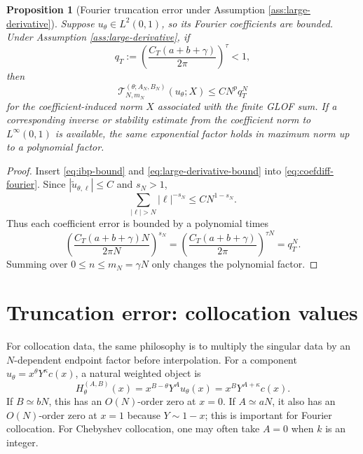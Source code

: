 \documentclass[11pt]{article}
\newtheorem{proposition}{Proposition}
\newcommand{\cT}{\mathcal{T}}
\begin{document}
\begin{proposition}[Fourier truncation error under Assumption \ref{ass:large-derivative}]\label{prop:fourier-trunc}
Suppose $u_\theta\in L^2(0,1)$, so its Fourier coefficients are bounded.  Under Assumption \ref{ass:large-derivative}, if
\begin{equation}\label{eq:qT-condition}
    q_T:=\left(\frac{C_T(a+b+\gamma)}{2\pi}\right)^\tau<1,
\end{equation}
then
\begin{equation}\label{eq:fourier-trunc-exp}
    \cT_{N,m_N}^{(\theta;A_N,B_N)}(u_\theta;X)
    \le C N^p q_T^N
\end{equation}
for the coefficient-induced norm $X$ associated with the finite GLOF sum.  If a corresponding inverse or stability estimate from the coefficient norm to $L^\infty(0,1)$ is available, the same exponential factor holds in maximum norm up to a polynomial factor.
\end{proposition}

\begin{proof}
Insert \eqref{eq:ibp-bound} and \eqref{eq:large-derivative-bound} into \eqref{eq:coefdiff-fourier}.  Since $|\widetilde u_{\theta,\ell}|\le C$ and $s_N>1$,
\[
    \sum_{|\ell|>N}|\ell|^{-s_N}\le C N^{1-s_N}.
\]
Thus each coefficient error is bounded by a polynomial times
\[
    \left(\frac{C_T(a+b+\gamma)N}{2\pi N}\right)^{s_N}
    =\left(\frac{C_T(a+b+\gamma)}{2\pi}\right)^{\tau N}
    =q_T^N.
\]
Summing over $0\le n\le m_N=\gamma N$ only changes the polynomial factor.
\end{proof}

\section{Truncation error: collocation values}

For collocation data, the same philosophy is to multiply the singular data by an $N$-dependent endpoint factor before interpolation.  For a component $u_\theta=x^\theta Y^\kappa c(x)$, a natural weighted object is
\begin{equation}\label{eq:Hcolloc}
    H_{\theta}^{(A,B)}(x)=x^{B-\theta}Y^A u_\theta(x)
    =x^B Y^{A+\kappa}c(x).
\end{equation}
If $B\simeq bN$, this has an $O(N)$-order zero at $x=0$.  If $A\simeq aN$, it also has an $O(N)$-order zero at $x=1$ because $Y\sim1-x$; this is important for Fourier collocation.  For Chebyshev collocation, one may often take $A=0$ when $k$ is an integer.
\end{document}
